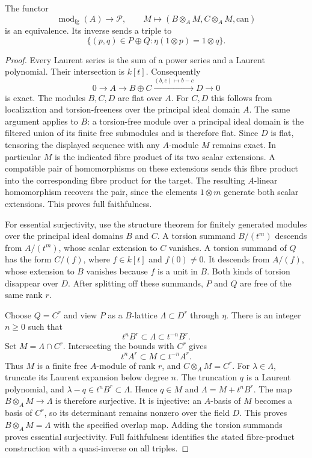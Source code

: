 \begin{theorem}
\label{v4-arith:w5-h:formal-patching}
The functor
\[
 \operatorname{mod}_{\mathrm{fg}}(A)\longrightarrow\mathcal P,
 \qquad M\longmapsto(B\otimes_A M,C\otimes_A M,\mathrm{can})
\]
is an equivalence. Its inverse sends a triple to
\[
 \{(p,q)\in P\oplus Q:\eta(1\otimes p)=1\otimes q\}.
\]
\end{theorem}
\begin{proof}
Every Laurent series is the sum of a power series and a Laurent
polynomial. Their intersection is $k[t]$. Consequently
\[
 0\longrightarrow A\longrightarrow B\oplus C
 \xrightarrow{(b,c)\mapsto b-c}D\longrightarrow0
\]
is exact. The modules $B,C,D$ are flat over $A$.
For $C,D$ this follows from localization and torsion-freeness over
the principal ideal domain $A$. The same argument applies to $B$:
a torsion-free module over a principal ideal domain is the filtered
union of its finite free submodules and is therefore flat.
Since $D$ is flat, tensoring the displayed sequence with any
$A$-module $M$ remains exact. In particular $M$ is the indicated
fibre product of its two scalar extensions.
A compatible pair of homomorphisms on these extensions sends this
fibre product into the corresponding fibre product for the target.
The resulting $A$-linear homomorphism recovers the pair, since the
elements $1\otimes m$ generate both scalar extensions.
This proves full faithfulness.

For essential surjectivity, use the structure theorem for finitely
generated modules over the principal ideal domains $B$ and $C$.
A torsion summand $B/(t^m)$ descends from $A/(t^m)$, whose scalar
extension to $C$ vanishes. A torsion summand of $Q$ has the form
$C/(f)$, where $f\in k[t]$ and $f(0)\ne0$.
It descends from $A/(f)$, whose extension to $B$ vanishes because
$f$ is a unit in $B$. Both kinds of torsion disappear over $D$.
After splitting off these summands, $P$ and $Q$ are free of the
same rank $r$.

Choose $Q=C^r$ and view $P$ as a $B$-lattice
$\Lambda\subset D^r$ through $\eta$.
There is an integer $n\ge0$ such that
\[
 t^nB^r\subset\Lambda\subset t^{-n}B^r.
\]
Set $M=\Lambda\cap C^r$. Intersecting the bounds with $C^r$ gives
\[
 t^nA^r\subset M\subset t^{-n}A^r.
\]
Thus $M$ is a finite free $A$-module of rank $r$, and
$C\otimes_A M=C^r$.
For $\lambda\in\Lambda$, truncate its Laurent expansion below
degree $n$. The truncation $q$ is a Laurent polynomial, and
$\lambda-q\in t^nB^r\subset\Lambda$. Hence $q\in M$ and
$\Lambda=M+t^nB^r$. The map $B\otimes_A M\to\Lambda$ is therefore
surjective. It is injective: an $A$-basis of $M$ becomes a basis
of $C^r$, so its determinant remains nonzero over the field $D$.
This proves $B\otimes_A M=\Lambda$ with the specified overlap map.
Adding the torsion summands proves essential surjectivity.
Full faithfulness identifies the stated fibre-product construction
with a quasi-inverse on all triples.
\end{proof}

